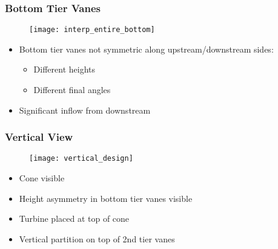 \documentclass[mathserif]{beamer}
\begin{document}
%
%
%
\begin{frame}
 \frametitle{Bottom Tier Vanes}
    \begin{figure}[htb]
     \centering
     \texttt{[image: interp\_entire\_bottom]}
    \end{figure}
 
 \begin{block}{}
  \begin{itemize}
   \item Bottom tier vanes not symmetric along upstream/downstream
	 sides:
	 \begin{itemize}
	  \item Different heights
	  \item Different final angles
	 \end{itemize}
   \item Significant inflow from downstream
  \end{itemize}
 \end{block}
\end{frame}

%
%
%
\begin{frame}
 \frametitle{Vertical View}
    \begin{figure}[htb]
     \centering
     \texttt{[image: vertical\_design]}
    \end{figure}
 
 \begin{block}{}
  \begin{itemize}
   \item Cone visible
   \item Height asymmetry in bottom tier vanes visible
   \item Turbine placed at top of cone
   \item Vertical partition on top of 2nd tier vanes 
  \end{itemize}
 \end{block}
\end{frame}
\end{document}

